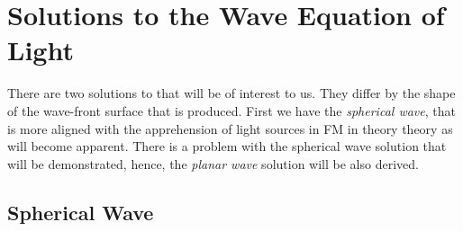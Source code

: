 \section[Wave Equation Solutions]{Solutions to the Wave Equation of Light}

There are two solutions to  that will be of interest to us.
They differ by the shape of the wave-front surface that is produced.
First we have the \emph{spherical wave}, that is more aligned with the apprehension of light sources in \ac{FM} in
    theory theory as will become apparent.
There is a problem with the spherical wave solution that will be demonstrated, hence, the \emph{planar wave} solution 
    will be also derived.


\subsection{Spherical Wave}

